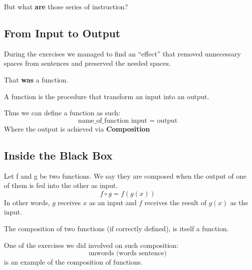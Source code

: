 \documentclass[compress,svgnames,handout,13.7pt]{beamer}
\begin{document}
\begin{frame}
    \Huge{But what \textbf{are} those series of instruction?}
\end{frame}
\subsection{From Input to Output}

\begin{frame}
    During the exercises we managed to find 
    an ``effect'' that removed unnecessary spaces from
    sentences and preserved the needed spaces. \pause\par
    \Huge{That \textbf{was} a function.}
    \pause\normalsize{}\begin{definition}[Function]
    A function is the procedure that transform an
    input into an output.
    \end{definition}
    \pause\begin{definition}
    Thus we can define a function as such:
    \[\text{name\_of\_function input = output}\]
    Where the output is achieved via \textbf{Composition}
  \end{definition}
\end{frame}
\subsection{Inside the Black Box}
\begin{frame}
    \begin{definition}[Composition]
        Let f and g be two functions. We say they are composed
        when the output of one of them is fed into the other as
        input.
        \pause\begin{equation}
            f \circ g = f(g(x))
        \end{equation}
        In other words, $g$ receives $x$ as an input and $f$ receives
        the result of $g(x)$ as the input.
    \end{definition}
    \pause\begin{corollary}
        The composition of two functions (if correctly defined), is
        itself a function.
    \end{corollary}
\end{frame}

\begin{frame}
    \begin{example}
        One of the exercises we did involved on such composition:
        \[\text{unwords (words sentence)}\] is an example of the composition of
        functions.
    \end{example}
\end{frame}
\end{document}
